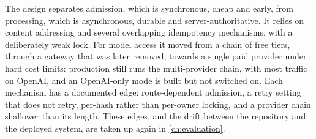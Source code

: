 The design separates admission, which is synchronous, cheap and early, from
processing, which is asynchronous, durable and server-authoritative. It relies
on content addressing and several overlapping idempotency mechanisms, with a
deliberately weak lock. For model access it moved from a chain of free tiers,
through a gateway that was later removed, towards a single paid provider under
hard cost limits: production still runs the multi-provider chain, with most
traffic on OpenAI, and an OpenAI-only mode is built but not switched on. Each
mechanism has a documented edge: route-dependent admission, a retry setting that
does not retry, per-hash rather than per-owner locking, and a provider chain
shallower than its length. These edges, and the drift between the
repository and the deployed system, are taken up again in
\cref{ch:evaluation}.
